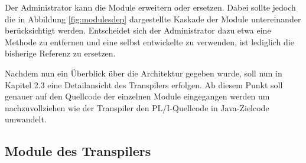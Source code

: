 Der Administrator kann die Module erweitern oder ersetzen.
Dabei sollte jedoch die in Abbildung \ref{fig:modulesdep} dargestellte Kaskade der Module untereinander berücksichtigt werden.
Entscheidet sich der Administrator dazu etwa eine Methode zu entfernen und eine selbst entwickelte zu verwenden, ist lediglich die bisherige 
Referenz zu ersetzen.

Nachdem nun ein Überblick über die Architektur gegeben wurde, soll nun in Kapitel 2.3 eine Detailansicht des Transpilers erfolgen.
Ab diesem Punkt soll genauer auf den Quellcode der einzelnen Module eingegangen werden um nachzuvollziehen wie der Transpiler den PL/I-Quellcode
in Java-Zielcode umwandelt.


 \pagebreak
\subsection{Module des Transpilers}

